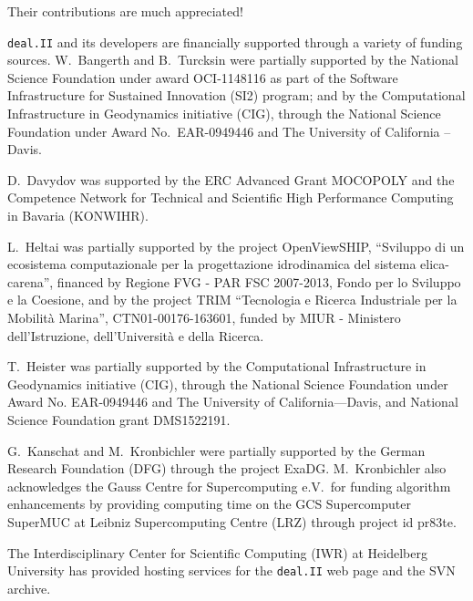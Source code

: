 \documentclass{ansarticle-preprint}
\newcommand{\specialword}[1]{\texttt{#1}}
\newcommand{\dealii}{{\specialword{deal.II}}}
\begin{document}
Their contributions are much appreciated!


\dealii{} and its developers are financially supported through a
variety of funding sources. W.~Bangerth and B.~Turcksin were partially
supported by the National Science Foundation under award OCI-1148116
as part of the Software Infrastructure for Sustained Innovation (SI2)
program; and by the Computational Infrastructure in Geodynamics initiative
(CIG), through the National Science Foundation under Award
No.~EAR-0949446 and The University of California -- Davis.

D.~Davydov was supported by the ERC Advanced Grant MOCOPOLY and the Competence Network for Technical and Scientific High Performance Computing in Bavaria (KONWIHR).

L.~Heltai was partially supported by the project OpenViewSHIP,
``Sviluppo di un ecosistema computazionale per la progettazione
idrodinamica del sistema elica-carena'', financed by Regione FVG - PAR
FSC 2007-2013, Fondo per lo Sviluppo e la Coesione, and by the project
TRIM ``Tecnologia e Ricerca Industriale per la Mobilit\`a Marina'',
CTN01-00176-163601, funded by MIUR -  Ministero dell'Istruzione,
dell'Universit\`a e della Ricerca.

T.~Heister was partially supported by the Computational Infrastructure in
Geodynamics initiative (CIG), through the National Science Foundation under Award No. EAR-0949446 and The University of California—Davis, and National Science Foundation grant DMS1522191.

G.~Kanschat and M.~Kronbichler were partially supported by the German Research
Foundation (DFG) through the project ExaDG. M.~Kronbichler also acknowledges
the Gauss Centre for Supercomputing e.V.~for funding algorithm enhancements by
providing computing time on the GCS Supercomputer SuperMUC at Leibniz
Supercomputing Centre (LRZ) through project id pr83te.

The Interdisciplinary Center for Scientific Computing (IWR) at Heidelberg University has provided
hosting services for the \dealii{} web page and the SVN archive.



{}

\end{document}

